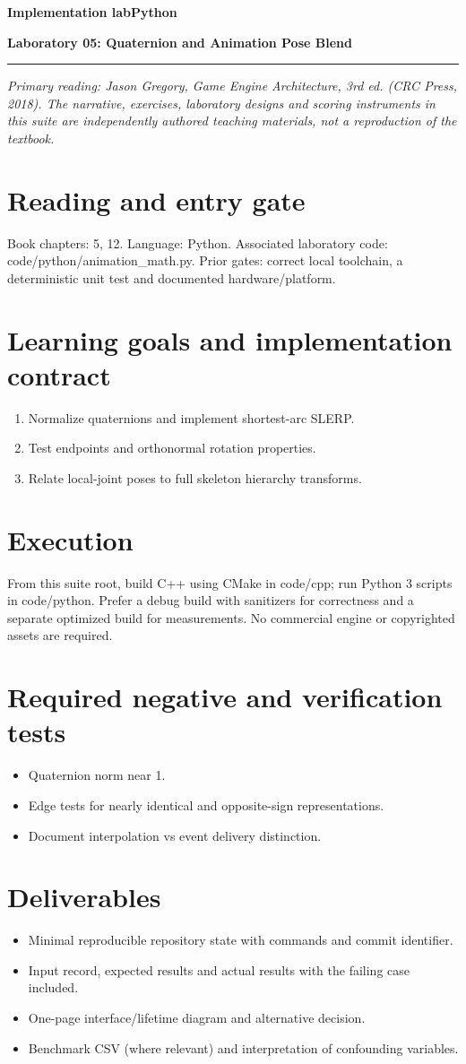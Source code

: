 \documentclass[11pt,letterpaper]{article}
\newcommand{\DocType}{Reference}
\newcommand{\SuiteHeading}[3]{%
\renewcommand{\DocType}{#2}%
{\small\bfseries\sffamily\color{EngineTeal}#2\hfill #3}\par\vspace{6pt}
{\LARGE\bfseries\color{EngineBlue}#1}\par\vspace{4pt}
{\color{EngineTeal}\rule{\linewidth}{1pt}}\par\vspace{7pt}}
\newcommand{\SourceNote}{\footnotesize\textit{Primary reading: Jason Gregory, \emph{Game Engine Architecture}, 3rd ed. (CRC Press, 2018). The narrative, exercises, laboratory designs and scoring instruments in this suite are independently authored teaching materials, not a reproduction of the textbook.}\normalsize\par}
\begin{document}
\SuiteHeading{Laboratory 05: Quaternion and Animation Pose Blend}{Implementation lab}{Python}
\SourceNote
\section{Reading and entry gate}
Book chapters: 5, 12. Language: Python. Associated laboratory code: code/python/animation\_math.py. Prior gates: correct local toolchain, a deterministic unit test and documented hardware/platform.

\section{Learning goals and implementation contract}
\begin{enumerate}
\item Normalize quaternions and implement shortest-arc SLERP.
\item Test endpoints and orthonormal rotation properties.
\item Relate local-joint poses to full skeleton hierarchy transforms.
\end{enumerate}
\section{Execution}
From this suite root, build C++ using CMake in code/cpp; run Python 3 scripts in code/python. Prefer a debug build with sanitizers for correctness and a separate optimized build for measurements. No commercial engine or copyrighted assets are required.

\section{Required negative and verification tests}
\begin{itemize}
\item Quaternion norm near 1.
\item Edge tests for nearly identical and opposite-sign representations.
\item Document interpolation vs event delivery distinction.
\end{itemize}
\section{Deliverables}
\begin{itemize}
\item Minimal reproducible repository state with commands and commit identifier.
\item Input record, expected results and actual results with the failing case included.
\item One-page interface/lifetime diagram and alternative decision.
\item Benchmark CSV (where relevant) and interpretation of confounding variables.
\end{itemize}
\end{document}
